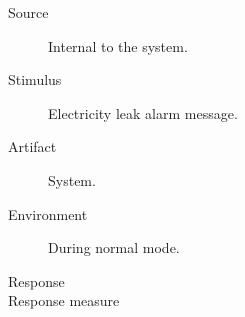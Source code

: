 \begin{description}
	\item[Source] Internal to the system.
	\item[Stimulus] Electricity leak alarm message.
	\item[Artifact] System.
	\item[Environment] During normal mode.
	\item[Response] %
	\item[Response measure] %
\end{description}